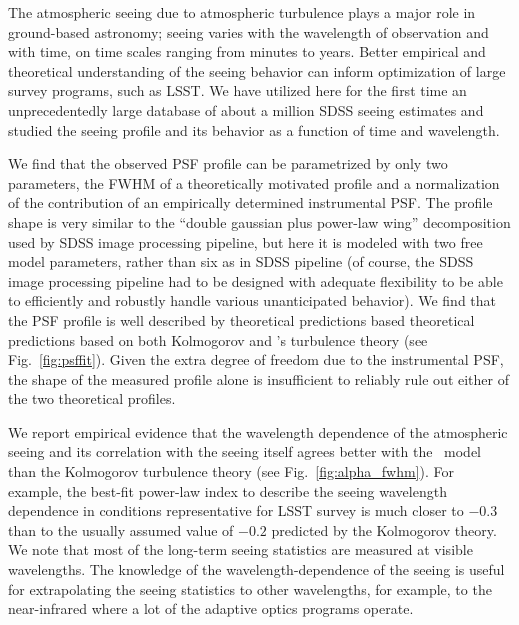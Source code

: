 
 
The atmospheric seeing due to atmospheric turbulence plays a major role in 
ground-based astronomy; seeing varies with the wavelength of observation
and with time, on time scales ranging from minutes to years. Better empirical
and theoretical understanding of the seeing behavior can inform optimization 
of large survey programs, such as LSST. We have utilized here for the first 
time an unprecedentedly large database of about a million SDSS seeing estimates
and studied the seeing profile and its behavior as a function of time and wavelength.

We find that the observed PSF profile can be parametrized by only two parameters, 
the FWHM of a theoretically motivated profile and a normalization of the contribution 
of an empirically determined instrumental PSF. The profile shape is very similar to 
the ``double gaussian plus power-law wing'' decomposition used by SDSS image
processing pipeline, but here it is modeled with two free model parameters, rather 
than six as in SDSS pipeline (of course, the SDSS image processing pipeline had
to be designed with adequate flexibility to be able to efficiently and robustly 
handle various unanticipated behavior). We find that the PSF profile is well 
described by theoretical predictions based theoretical predictions based on both 
Kolmogorov and \vk's turbulence theory (see Fig.~\ref{fig:psffit}). Given the extra 
degree of freedom due to the instrumental PSF, the shape of the measured profile alone 
is insufficient to reliably rule out either of the two theoretical profiles.  

We report empirical evidence that the wavelength dependence of the atmospheric 
seeing and its correlation with the seeing itself agrees better with the \vk~model 
than the Kolmogorov turbulence theory (see Fig.~\ref{fig:alpha_fwhm}). For example, 
the best-fit power-law index to describe the seeing wavelength dependence in conditions 
representative for LSST survey is much closer to $-0.3$ than to the usually assumed value
of $-0.2$ predicted by the Kolmogorov theory. 
We note that most of the long-term seeing statistics are measured at visible 
wavelengths. The knowledge of the wavelength-dependence of the seeing is useful 
for extrapolating the seeing statistics to other wavelengths, for example, to
the near-infrared where a lot of the adaptive optics programs operate. 


